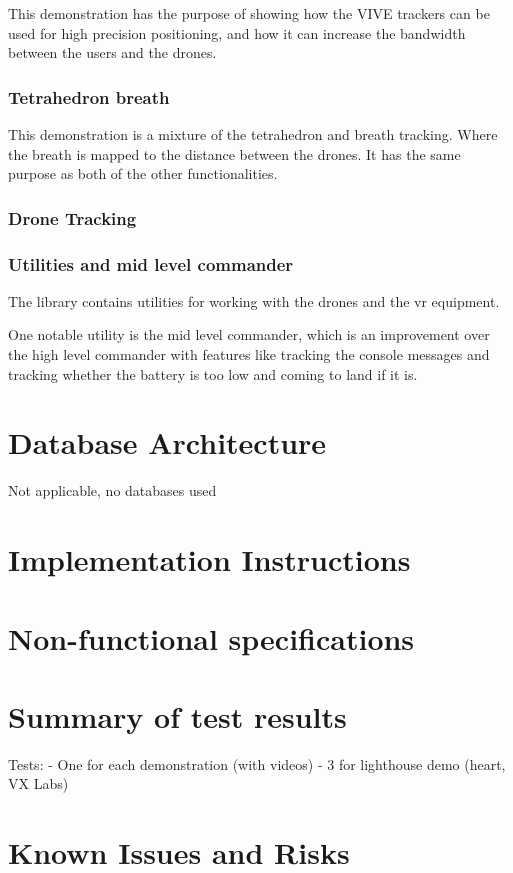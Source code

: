 \documentclass{article}
\begin{document}
  This demonstration has the purpose of showing how the VIVE trackers can be
  used for high precision positioning, and how it can increase the bandwidth
  between the users and the drones.

  \subsubsection{Tetrahedron breath}
  This demonstration is a mixture of the tetrahedron and breath tracking. Where
  the breath is mapped to the distance between the drones. It has the same
  purpose as both of the other functionalities.

  \subsubsection{Drone Tracking}

  \subsubsection{Utilities and mid level commander}
  The library contains utilities for working with the drones and the vr equipment.

  One notable utility is the mid level commander, which is an improvement over
  the high level commander with features like tracking the console messages
  and tracking whether the battery is too low and coming to land if it is.
  
  \section {Database Architecture}

  Not applicable, no databases used

  \section {Implementation Instructions}
  
  \section {Non-functional specifications}
  \section {Summary of test results}
  Tests:
    - One for each demonstration (with videos)
    - 3 for lighthouse demo (heart, VX Labs)
  \section {Known Issues and Risks}
\end{document}

